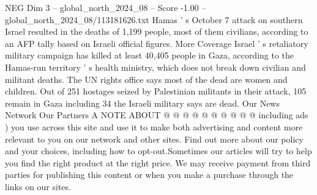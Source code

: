 \begin{textsample}{NEG Dim 3 – global\_north\_2024\_08 – Score -1.00 – global\_north\_2024\_08/113181626.txt}
Hamas ' s October 7 attack on southern Israel resulted in the deaths of 1,199 people, most of them civilians, according to an AFP tally based on Israeli official figures.
More Coverage Israel ' s retaliatory military campaign has killed at least 40,405 people in Gaza, according to the Hamas-run territory ' s health ministry, which does not break down civilian and militant deaths.
The UN rights office says most of the dead are women and children.
Out of 251 hostages seized by Palestinian militants in their attack, 105 remain in Gaza including 34 the Israeli military says are dead.
Our News Network Our Partners A NOTE ABOUT @ @ @ @ @ @ @ @ @ @ including ads ) you use across this site and use it to make both advertising and content more relevant to you on our network and other sites.
Find out more about our policy and your choices, including how to opt-out.Sometimes our articles will try to help you find the right product at the right price.
We may receive payment from third parties for publishing this content or when you make a purchase through the links on our sites.

\end{textsample}
